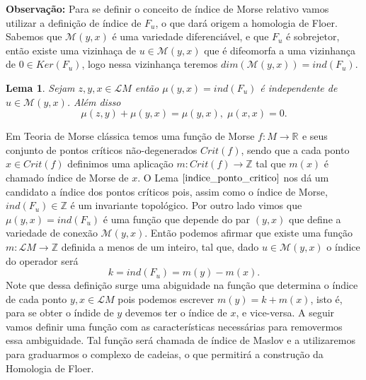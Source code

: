 \documentclass[12pt]{book}
\newtheorem{lema}[teorema]{Lema}
\newcommand{\inteiros}{\mathbb{Z}}
\newcommand{\real}[1]{\mathbb{R}^{#1}}
\newcommand{\solucoesperiodicascontrateis}{\mathcal{L}M}
\begin{document}
	\textbf{Observação:} Para se definir o conceito de índice de Morse relativo vamos utilizar a definição de índice de $F_{u}$, o que dará origem a homologia de Floer. Sabemos que $\mathcal{M}(y,x)$ é uma variedade diferenciável, e que $F_{u}$ é sobrejetor, então existe uma vizinhaça de $u \in \mathcal{M}(y,x)$ que é difeomorfa a uma vizinhança de $0 \in Ker(F_{u})$, logo nessa vizinhança teremos $dim(\mathcal{M}(y,x)) = ind(F_{u})$.
	
	\begin{lema}\label{indice_ponto_critico} Sejam $z,y,x \in \solucoesperiodicascontrateis$ então $\mu(y,x) = ind(F_{u})$ é independente de $u \in \mathcal{M}(y,x)$. Além disso
		$$
		\mu(z,y) + \mu(y,x) = \mu(y,x), \; \mu(x,x) = 0.   
		$$
	\end{lema}
	Em Teoria de Morse clássica temos uma função de Morse $f:M\to \real{}$ e seus conjunto de pontos críticos não-degenerados $Crit(f)$, sendo que a cada ponto $x \in Crit(f)$ definimos uma aplicação $m:Crit(f) \to \inteiros$ tal que $m(x)$ é chamado índice de Morse de $x$.	O Lema $\ref{indice_ponto_critico}$ nos dá um candidato a índice dos pontos críticos pois, assim como o índice de Morse, $ind(F_{u}) \in \inteiros$ é um invariante topológico. Por outro lado vimos que $\mu(y,x) = ind(F_{u})$ é uma função que depende do par $(y, x)$ que define a variedade de conexão $\mathcal{M}(y, x)$. Então podemos afirmar que existe uma função $m : \solucoesperiodicascontrateis \to \inteiros$ definida a menos de um inteiro, tal que, dado $u \in \mathcal{M}(y,x)$ o índice do operador será 
	$$
	k = ind(F_{u}) = m(y)-m(x).
	$$
	Note que dessa definição surge uma abiguidade na função que determina o índice de cada ponto $y,x \in \solucoesperiodicascontrateis$ pois podemos escrever $m(y) = k+m(x)$, isto é, para se obter o índide de $y$ devemos ter o índice de $x$, e vice-versa. A seguir vamos definir uma função com as características necessárias para removermos essa ambiguidade. Tal função será chamada de índice de Maslov e a utilizaremos para graduarmos o complexo de cadeias, o que permitirá a construção da Homologia de Floer. 
	
\end{document}
